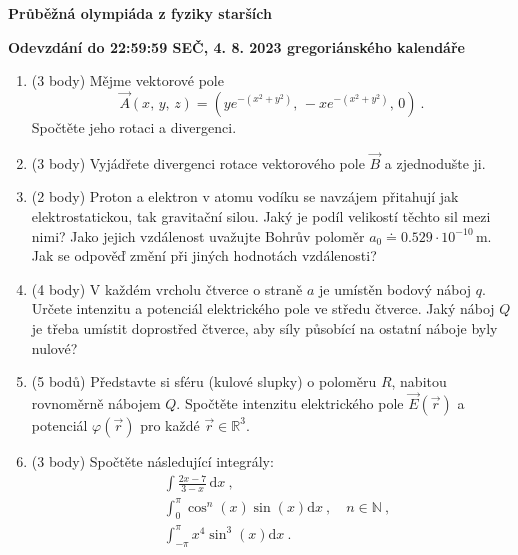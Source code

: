 \documentclass[12pt,a4paper]{article}
\begin{document}
\begin{center}
    \textbf{\Large Průběžná olympiáda z fyziky starších}
    \vspace{1em}
    
    \textbf{Odevzdání do 22:59:59 SEČ, 4. 8. 2023 gregoriánského kalendáře}
\end{center}
\vspace{1em}

\begin{enumerate}[label=\arabic*)]

\item (3 body) Mějme vektorové pole
\begin{equation*}
    \vec{A}\left(x,\, y,\, z\right) = \left(ye^{-\left(x^2+y^2\right)},\, -xe^{-\left(x^2+y^2\right)},\, 0\right) ~.
\end{equation*}
Spočtěte jeho rotaci a divergenci.

\item (3 body)
Vyjádřete divergenci rotace vektorového pole $\vec{B}$ a zjednodušte ji.

\item (2 body) Proton a elektron v atomu vodíku se navzájem přitahují jak elektrostatickou, tak gravitační silou. Jaký je podíl velikostí těchto sil mezi nimi? Jako jejich vzdálenost uvažujte Bohrův poloměr $a_0 \doteq 0.529\cdot 10^{-10}\,\mathrm{m}$. Jak se odpověď změní při jiných hodnotách vzdálenosti?

\item (4 body) V každém vrcholu čtverce o straně $a$ je umístěn bodový náboj $q$. Určete intenzitu a potenciál elektrického pole ve středu čtverce. Jaký náboj $Q$ je třeba umístit doprostřed čtverce, aby síly působící na ostatní náboje byly nulové?

\item (5 bodů) Představte si sféru (kulové slupky) o poloměru $R$, nabitou rovnoměrně nábojem $Q$. Spočtěte intenzitu elektrického pole $\vec{E}\left(\vec{r}\right)$ a potenciál $\varphi\left(\vec{r}\right)$ pro každé $\vec{r}\in\mathbb{R}^3$.

\item (3 body) Spočtěte následující integrály:
\begin{align*}
    &\int \frac{2x-7}{3-x}\,\mathrm{d}x ~,\\
    &\int_0^\pi \cos^n\left(x\right)\sin\left(x\right)\mathrm{d}x ~,\quad n\in\mathbb{N} ~,\\
    &\int_{-\pi}^{\pi} x^4\sin^3\left(x\right)\mathrm{d}x ~.
\end{align*}

\end{enumerate}
\end{document}
